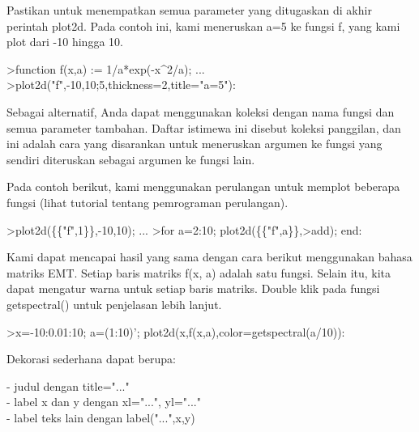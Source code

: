 \documentclass[a4paper,10pt]{article}
\begin{document}
\begin{eulernotebook}
\begin{eulercomment}
\begin{eulercomment}
\begin{eulercomment}
\begin{eulercomment}
\begin{eulercomment}
\begin{eulercomment}
\begin{eulercomment}
Pastikan untuk menempatkan semua parameter yang ditugaskan di akhir
perintah plot2d. Pada contoh ini, kami meneruskan a=5 ke fungsi f,
yang kami plot dari -10 hingga 10.
\end{eulercomment}
\begin{eulerprompt}
>function f(x,a) := 1/a*exp(-x^2/a); ...
>plot2d("f",-10,10;5,thickness=2,title="a=5"):
\end{eulerprompt}
\begin{eulercomment}
Sebagai alternatif, Anda dapat menggunakan koleksi dengan nama fungsi
dan semua parameter tambahan. Daftar istimewa ini disebut koleksi
panggilan, dan ini adalah cara yang disarankan untuk meneruskan
argumen ke fungsi yang sendiri diteruskan sebagai argumen ke fungsi
lain.

Pada contoh berikut, kami menggunakan perulangan untuk memplot
beberapa fungsi (lihat tutorial tentang pemrograman perulangan).
\end{eulercomment}
\begin{eulerprompt}
>plot2d(\{\{"f",1\}\},-10,10); ...
>for a=2:10; plot2d(\{\{"f",a\}\},>add); end:
\end{eulerprompt}
\begin{eulercomment}
Kami dapat mencapai hasil yang sama dengan cara berikut menggunakan
bahasa matriks EMT. Setiap baris matriks f(x, a) adalah satu fungsi.
Selain itu, kita dapat mengatur warna untuk setiap baris matriks.
Double klik pada fungsi getspectral() untuk penjelasan lebih lanjut.
\end{eulercomment}
\begin{eulerprompt}
>x=-10:0.01:10; a=(1:10)'; plot2d(x,f(x,a),color=getspectral(a/10)):
\end{eulerprompt}
\begin{eulercomment}
Dekorasi sederhana dapat berupa:

- judul dengan title="..."\\
- label x dan y dengan xl="...", yl="..."\\
- label teks lain dengan label("...",x,y)


\end{eulercomment}
\end{eulercomment}
\end{eulercomment}
\end{eulercomment}
\end{eulercomment}
\end{eulercomment}
\end{eulercomment}
\end{eulernotebook}
\end{document}
